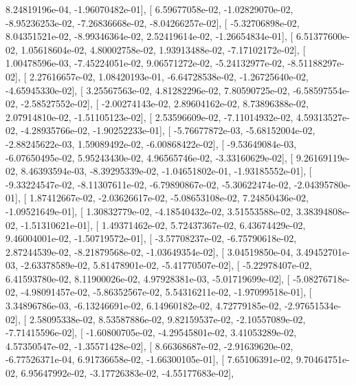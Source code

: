 \documentclass{article}
\begin{document}
          8.24819196e-04,  -1.96070482e-01],
       [  6.59677058e-02,  -1.02829070e-02,  -8.95236253e-02,
         -7.26836668e-02,  -8.04266257e-02],
       [ -5.32706898e-02,   8.04351521e-02,  -8.99346364e-02,
          2.52419614e-02,  -1.26654834e-01],
       [  6.51377600e-02,   1.05618604e-02,   4.80002758e-02,
          1.93913488e-02,  -7.17102172e-02],
       [  1.00478596e-03,  -7.45224051e-02,   9.06571272e-02,
         -5.24132977e-02,  -8.51188297e-02],
       [  2.27616657e-02,   1.08420193e-01,  -6.64728538e-02,
         -1.26725640e-02,  -4.65945330e-02],
       [  3.25567563e-02,   4.81282296e-02,   7.80590725e-02,
         -6.58597554e-02,  -2.58527552e-02],
       [ -2.00274143e-02,   2.89604162e-02,   8.73896388e-02,
          2.07914810e-02,  -1.51105123e-02],
       [  2.53596609e-02,  -7.11014932e-02,   4.59313527e-02,
         -4.28935766e-02,  -1.90252233e-01],
       [ -5.76677872e-03,  -5.68152004e-02,  -2.88245622e-03,
          1.59089492e-02,  -6.00868422e-02],
       [ -9.53649084e-03,  -6.07650495e-02,   5.95243430e-02,
          4.96565746e-02,  -3.33160629e-02],
       [  9.26169119e-02,   8.46393594e-03,  -8.39295339e-02,
         -1.04651802e-01,  -1.93185552e-01],
       [ -9.33224547e-02,  -8.11307611e-02,  -6.79890867e-02,
         -5.30622474e-02,  -2.04395780e-01],
       [  1.87412667e-02,  -2.03626617e-02,  -5.08653108e-02,
          7.24850436e-02,  -1.09521649e-01],
       [  1.30832779e-02,  -4.18540432e-02,   3.51553588e-02,
          3.38394808e-02,  -1.51310621e-01],
       [  1.49371462e-02,   5.72437367e-02,   6.43674429e-02,
          9.46004001e-02,  -1.50719572e-01],
       [ -3.57708237e-02,  -6.75790618e-02,   2.87244539e-02,
         -8.21879568e-02,  -1.03649354e-02],
       [  3.04519850e-04,   3.49452701e-03,  -2.63378589e-02,
          5.81478901e-02,  -5.41770507e-02],
       [ -5.22978407e-02,   6.41593780e-02,   8.11900026e-02,
          4.97928381e-03,  -5.01719699e-02],
       [ -5.08276718e-02,  -4.98091457e-02,  -5.86352567e-02,
          5.54316211e-02,  -1.97099518e-01],
       [  3.34896786e-03,  -6.13246691e-02,   6.14960182e-02,
          4.72779185e-02,  -2.97651534e-02],
       [  2.58095338e-02,   8.53587886e-02,   9.82159537e-02,
         -2.10557089e-02,  -7.71415596e-02],
       [ -1.60800705e-02,  -4.29545801e-02,   3.41053289e-02,
          4.57350547e-02,  -1.35571428e-02],
       [  8.66368687e-02,  -2.91639620e-02,  -6.77526371e-04,
          6.91736658e-02,  -1.66300105e-01],
       [  7.65106391e-02,   9.70464751e-02,   6.95647992e-02,
         -3.17726383e-02,  -4.55177683e-02],
\end{document}
